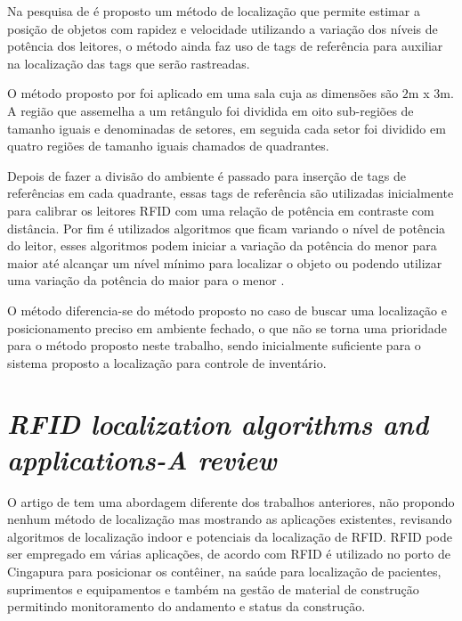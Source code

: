 Na pesquisa de  é proposto um método de localização que permite estimar a posição de objetos 
com rapidez e velocidade utilizando a variação dos níveis de potência dos leitores, o método ainda faz uso de tags de 
referência para auxiliar na localização das tags que serão rastreadas.


O método proposto por  foi aplicado em uma sala cuja as dimensões são $2$m x $3$m. 
A região que assemelha a um retângulo foi dividida em oito sub-regiões de tamanho iguais e denominadas de setores, 
em seguida cada setor foi dividido em quatro regiões de tamanho iguais chamados de quadrantes.

\par
Depois de fazer a divisão do ambiente é passado para inserção de tags de referências em cada quadrante, 
essas tags de referência são utilizadas inicialmente para calibrar os leitores RFID com uma relação de potência em 
contraste com distância. Por fim é utilizados algoritmos que ficam variando o nível de potência do leitor, esses algoritmos 
podem iniciar a variação da potência do menor para maior até alcançar um nível mínimo para localizar o objeto ou podendo utilizar 
uma variação da potência do maior para o menor \cite{localization2010}.

\par
O método  diferencia-se do método proposto no caso de buscar uma localização e posicionamento 
preciso em ambiente fechado, o que não se torna uma prioridade para o método proposto neste trabalho, sendo inicialmente suficiente 
para o sistema proposto a localização para controle de inventário.


\section{\textit{RFID localization algorithms and applications-A review}}

O artigo de  tem uma abordagem diferente dos trabalhos anteriores, não propondo nenhum método de 
localização mas mostrando as aplicações existentes, revisando algoritmos de localização indoor e potenciais da 
localização de RFID.
%
RFID pode ser empregado em várias aplicações, de acordo com  RFID é utilizado no porto de 
Cingapura para posicionar os contêiner, na saúde para localização de pacientes, suprimentos e equipamentos e também na gestão de 
material de construção permitindo monitoramento do andamento e status da construção.

